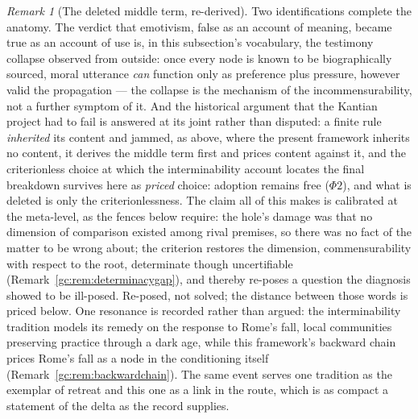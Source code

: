 \documentclass[11pt]{article}
\numberwithin{equation}{section}
\theoremstyle{plain}
\theoremstyle{definition}
\theoremstyle{remark}
\newtheorem{remark}[theorem]{Remark}
\begin{document}
\begin{remark}[The deleted middle term, re-derived]
Two identifications complete the anatomy. The verdict that emotivism,
false as an account of meaning, became true as an account of use is,
in this subsection's vocabulary, the testimony collapse observed from
outside: once every node is known to be biographically sourced, moral
utterance \emph{can} function only as preference plus pressure,
however valid the propagation --- the collapse is the mechanism of
the incommensurability, not a further symptom of it. And the
historical argument that the Kantian project had to fail is answered
at its joint rather than disputed: a finite rule \emph{inherited} its
content and jammed, as above, where the present framework inherits no
content, it derives the middle term first and prices content
against it, and the criterionless choice at which the
interminability account locates the final breakdown survives here as
\emph{priced} choice: adoption remains free ($\Phi2$), and what is
deleted is only the criterionlessness. The claim all of this makes is
calibrated at the meta-level, as the fences below require: the hole's
damage was that no dimension of comparison existed among rival
premises, so there was no fact of the matter to be wrong about; the
criterion restores the dimension, commensurability with respect to
the root, determinate though uncertifiable
(Remark~\ref{gc:rem:determinacygap}), and thereby re-poses a
question the diagnosis showed to be ill-posed. Re-posed, not solved;
the distance between those words is priced below. One resonance is
recorded rather than argued: the interminability tradition models its
remedy on the response to Rome's fall, local communities
preserving practice through a dark age, while this framework's
backward chain prices Rome's fall as a node in the conditioning
itself (Remark~\ref{gc:rem:backwardchain}). The same event serves one
tradition as the exemplar of retreat and this one as a link in the
route, which is as compact a statement of the delta as the record
supplies.
\end{remark}
\end{document}
